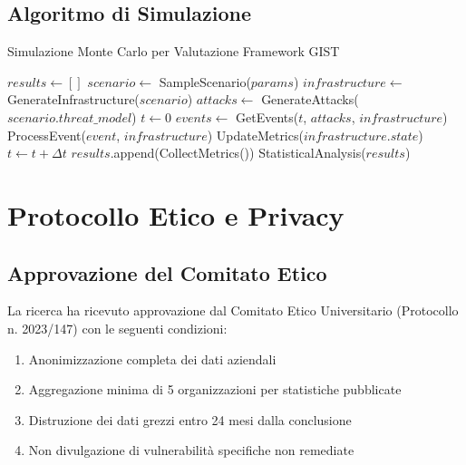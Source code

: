 \subsection{\texorpdfstring{Algoritmo di Simulazione}{A.3.2 - Algoritmo di Simulazione}}

\begin{algorithm}
\caption{Simulazione Monte Carlo per Valutazione Framework GIST}
\begin{algorithmic}[1]
    \State $results \gets []$
        \State $scenario \gets$ SampleScenario($params$)
        \State $infrastructure \gets$ GenerateInfrastructure($scenario$)
        \State $attacks \gets$ GenerateAttacks($scenario.threat\_model$)
        \State $t \gets 0$
            \State $events \gets$ GetEvents($t$, $attacks$, $infrastructure$)
                \State ProcessEvent($event$, $infrastructure$)
                \State UpdateMetrics($infrastructure.state$)
            \EndFor
            \State $t \gets t + \Delta t$
        \EndWhile
        \State $results$.append(CollectMetrics())
    \EndFor
    \State \Return StatisticalAnalysis($results$)
\EndProcedure
\end{algorithmic}
\end{algorithm}

\section{\texorpdfstring{Protocollo Etico e Privacy}{A.4 - Protocollo Etico e Privacy}}

\subsection{\texorpdfstring{Approvazione del Comitato Etico}{A.4.1 - Approvazione del Comitato Etico}}

La ricerca ha ricevuto approvazione dal Comitato Etico Universitario (Protocollo n. 2023/147) con le seguenti condizioni:

\begin{enumerate}
    \item Anonimizzazione completa dei dati aziendali
    \item Aggregazione minima di 5 organizzazioni per statistiche pubblicate
    \item Distruzione dei dati grezzi entro 24 mesi dalla conclusione
    \item Non divulgazione di vulnerabilità specifiche non remediate
\end{enumerate}

